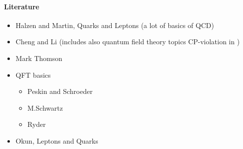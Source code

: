 \paragraph{Literature}
\begin{itemize}
   \item Halzen and Martin, Quarks and Leptons (a lot of basics of QCD)
   \item Cheng and Li (includes also quantum field theory topics CP-violation in \sm)
   \item Mark Thomson
   \item QFT basics
      \begin{itemize}
         \item Peskin and Schroeder
         \item M.Schwartz
         \item Ryder
      \end{itemize}
   \item Okun, Leptons and Quarks
\end{itemize}

